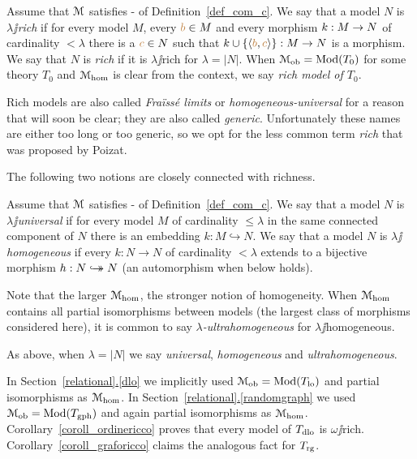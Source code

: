 \documentclass[creche.tex]{subfiles}
\begin{document}
\begin{definition}
Assume that $\EuScript M$ satisfies - of Definition~\ref{def_com_c}. We say that a model $N$ is \emph{$\lambda\jj$rich\/} if for every model $M$, every ${\color{brown} b}\in M$ and every morphism $k:M\rightarrow N$ of cardinality $<\lambda$ there is a ${\color{brown} c}\in N$ such that $k\cup\{\langle{\color{brown}b},{\color{brown} c}\rangle\}:M\to N$ is a morphism. We say that $N$ is \emph{rich\/} if it is $\lambda\jj$rich for $\lambda=|N|$. When $\EuScript M_{\rm ob}=\mathop{\rm Mod}(T_0)$ for some theory $T_0$ and $\EuScript M_{\rm hom}$ is clear from the context, we say \emph{rich model of $T_0$}.\QED
\end{definition}

Rich models are also called \textit{Fra\"iss\'e limits} or \textit{homogeneous-universal\/} for a reason that will soon be clear; they are also called \textit{generic}. Unfortunately these names are either too long or too generic, so we opt for the less common term \textit{rich\/} that was proposed by Poizat. 

The following two notions are closely connected with richness.

\begin{definition}\label{def_omogenea_universale}
Assume that $\EuScript M$ satisfies - of Definition~\ref{def_com_c}. We say that a model $N$ is \emph{$\lambda\jj$universal\/} if for every model $M$ of cardinality $\le\lambda$ in the same connected component of $N$ there is an embedding $k:M\hookrightarrow N$. We say that a model $N$ is \emph{$\lambda\jj$homogeneous\/} if every $k:N\to N$ of cardinality $<\lambda$ extends to a bijective morphism $h:N\hookrightarrow\mathrel{\mspace{-15mu}}\rightarrow N$ (an automorphism when  below holds).

Note that the larger $\EuScript M_{\rm hom}$, the stronger notion of homogeneity. When  $\EuScript M_{\rm hom}$ contains all partial isomorphisms between models (the largest class of morphisms considered here), it is common to say \emph{$\lambda$-ultra\-homo\-geneous\/} for $\lambda\jj$homogeneous. 

As above, when $\lambda=|N|$ we say \emph{universal}, \emph{homogeneous} and \emph{ultrahomogeneous}.\QED
\end{definition}


In Section~\hyperref[dlo]{\ref*{relational}.\ref*{dlo}} we implicitly used $\EuScript M_{\rm ob}=\mathop{\rm Mod}(T_{\rm lo})$ and partial isomorphisms as $\EuScript M_{\rm hom}$. In Section~\hyperref[randomgraph]{\ref*{relational}.\ref*{randomgraph}} we used $\EuScript M_{\rm ob}=\mathop{\rm Mod}(T_{\rm gph})$ and again partial isomorphisms as $\EuScript M_{\rm hom}$. Corollary~\ref{coroll_ordinericco} proves that every model of $T_{\rm dlo}$ is $\omega\jj$rich.  Corollary~\ref{coroll_graforicco} claims the analogous fact for $T_{\rm rg}$.
\end{document}
